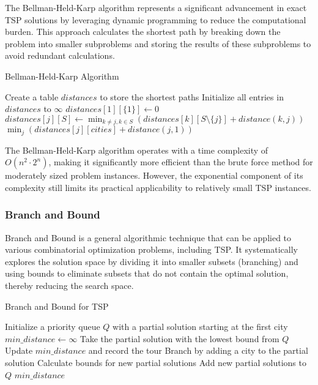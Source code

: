 The Bellman-Held-Karp algorithm represents a significant advancement in exact TSP solutions by leveraging dynamic programming to reduce the computational burden. This approach calculates the shortest path by breaking down the problem into smaller subproblems and storing the results of these subproblems to avoid redundant calculations.

\begin{algorithm}
	\caption{Bellman-Held-Karp Algorithm}\label{bellmanheldkarp}
	\begin{algorithmic}[1]
		\State Create a table $distances$ to store the shortest paths
		\State Initialize all entries in $distances$ to $\infty$
		\State $distances[1][\{1\}] \gets 0$ 
		\State $distances[j][S] \gets \min_{k \neq j, k \in S} (distances[k][S\setminus\{j\}] + distance(k, j))$
		\EndFor
		\EndFor
		\EndFor
		\State \Return $\min_{j}(distances[j][cities] + distance(j, 1))$
		\EndProcedure
	\end{algorithmic}
\end{algorithm}

The Bellman-Held-Karp algorithm operates with a time complexity of $O(n^2 \cdot 2^n)$, making it significantly more efficient than the brute force method for moderately sized problem instances. However, the exponential component of its complexity still limits its practical applicability to relatively small TSP instances.

\subsubsection{Branch and Bound}

Branch and Bound is a general algorithmic technique that can be applied to various combinatorial optimization problems, including TSP. It systematically explores the solution space by dividing it into smaller subsets (branching) and using bounds to eliminate subsets that do not contain the optimal solution, thereby reducing the search space.

\begin{algorithm}
	\caption{Branch and Bound for TSP}\label{branchbound}
	\begin{algorithmic}[1]
		\State Initialize a priority queue $Q$ with a partial solution starting at the first city
		\State $min\_distance \gets \infty$
		\State Take the partial solution with the lowest bound from $Q$
		\State Update $min\_distance$ and record the tour
		\EndIf
		\Else
		\State Branch by adding a city to the partial solution
		\State Calculate bounds for new partial solutions
		\State Add new partial solutions to $Q$
		\EndIf
		\EndWhile
		\State \Return $min\_distance$
		\EndProcedure
	\end{algorithmic}
\end{algorithm}

